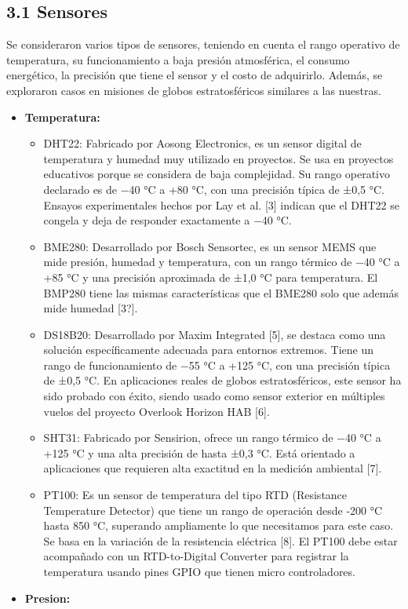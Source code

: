 \documentclass[12pt,a4paper]{article}
\begin{document}
\subsection{3.1 Sensores}\label{sensores}

Se consideraron varios tipos de sensores, teniendo en cuenta el rango operativo de temperatura, su funcionamiento a baja presión atmosférica, el consumo energético, la precisión que tiene el sensor y el costo de adquirirlo. Además, se exploraron casos en misiones de globos estratosféricos similares a las nuestras.

\begin{itemize}
\item
  \textbf{Temperatura:}

  \begin{itemize}
  \item
    DHT22: Fabricado por Aosong Electronics, es un sensor digital de temperatura y humedad muy utilizado en proyectos. Se usa en proyectos educativos porque se considera de baja complejidad. Su rango operativo declarado es de −40 °C a +80 °C, con una precisión típica de ±0,5 °C. Ensayos experimentales hechos por Lay et al. {[}3{]} indican que el DHT22 se congela y deja de responder exactamente a −40 °C.
  \item
    BME280: Desarrollado por Bosch Sensortec, es un sensor MEMS que mide presión, humedad y temperatura, con un rango térmico de −40 °C a +85 °C y una precisión aproximada de ±1,0 °C para temperatura. El BMP280 tiene las mismas características que el BME280 solo que además mide humedad {[}3?{]}.
  \item
    DS18B20: Desarrollado por Maxim Integrated {[}5{]}, se destaca como una solución específicamente adecuada para entornos extremos. Tiene un rango de funcionamiento de −55 °C a +125 °C, con una precisión típica de ±0,5 °C. En aplicaciones reales de globos estratosféricos, este sensor ha sido probado con éxito, siendo usado como sensor exterior en múltiples vuelos del proyecto Overlook Horizon HAB {[}6{]}.
  \item
    SHT31: Fabricado por Sensirion, ofrece un rango térmico de −40 °C a +125 °C y una alta precisión de hasta ±0,3 °C. Está orientado a aplicaciones que requieren alta exactitud en la medición ambiental {[}7{]}.
  \item
    PT100: Es un sensor de temperatura del tipo RTD (Resistance Temperature Detector) que tiene un rango de operación desde -200 °C hasta 850 °C, superando ampliamente lo que necesitamos para este caso. Se basa en la variación de la resistencia eléctrica {[}8{]}. El PT100 debe estar acompañado con un RTD-to-Digital Converter para registrar la temperatura usando pines GPIO que tienen micro controladores.
  \end{itemize}
\item
  \textbf{Presion:}


\end{itemize}
\end{document}
